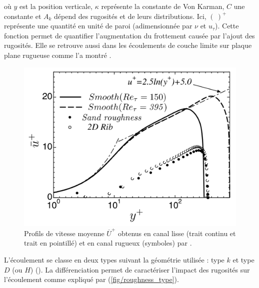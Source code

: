 où $y$ est la position verticale, $\kappa$ représente la constante de Von Karman, $C$ une constante et $A_{k}$ dépend des rugosités et de leurs distributions. Ici, $(~)^{+}$ représente une quantité en unité de paroi (adimensionnée par $\nu$ et $u_{\tau}$). Cette fonction permet de quantifier l'augmentation du frottement causée par l'ajout des rugosités. Elle se retrouve aussi dans les écoulements de couche limite sur plaque plane rugueuse comme l'a montré \cite{Clauser1954}.

\begin{figure}[!hbtp]
    \centering
    \includegraphics[width=0.65\linewidth]{Chap1/Pictures/Ecoulement_rugueux/U_mean_rough_miyake.png}
    \caption{Profils de vitesse moyenne $\overline{U}^{+}$ obtenus en canal lisse (trait continu et trait en pointillé) et en canal rugueux (symboles) par \cite{Miyake2001}.}
    \label{fig/u_mean_rough}
\end{figure}

L'écoulement se classe en deux types suivant la géométrie utilisée : type $k$ et type $D$ (ou $H$) (\cite{Perry1969}). La différenciation permet de caractériser l'impact des rugosités sur l'écoulement comme expliqué par \cite{Leonardi2007} (\cref{fig/roughness_type}).\\

